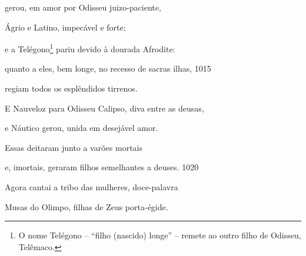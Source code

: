 gerou, em amor por Odisseu juizo-paciente,

Ágrio e Latino, impecável e forte;

e a Telégono\footnote{O nome Telégono -- ``filho (nascido) longe'' -- remete ao outro filho de Odisseu, Telêmaco.} pariu devido à dourada Afrodite:

quanto a eles, bem longe, no recesso de sacras ilhas, \num{1015}

regiam todos os esplêndidos tirrenos.

\quad{}E Nauveloz para Odisseu Calipso, diva entre as deusas,

e Náutico gerou, unida em desejável amor.

\quad{}Essas deitaram junto a varões mortais

e, imortais, geraram filhos semelhantes a deuses. \num{1020}

Agora cantai a tribo das mulheres, doce-palavra

Musas do Olimpo, filhas de Zeus porta-égide.

\endgroup